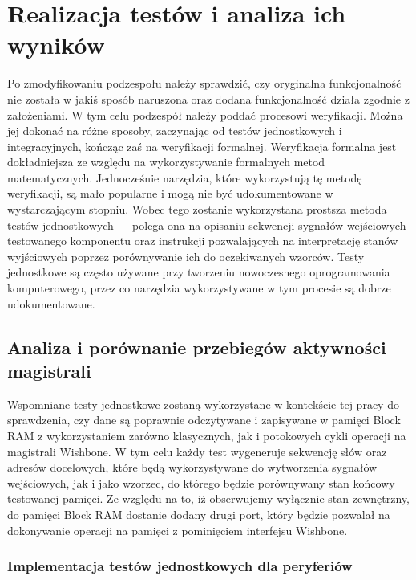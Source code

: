 \section{Realizacja testów i analiza ich wyników}

Po zmodyfikowaniu podzespołu należy sprawdzić, czy oryginalna funkcjonalność nie została w jakiś sposób naruszona oraz dodana funkcjonalność działa zgodnie z założeniami. W tym celu podzespół należy poddać procesowi weryfikacji. Można jej dokonać na różne sposoby, zaczynając od testów jednostkowych i integracyjnych, kończąc zaś na weryfikacji formalnej.
Weryfikacja formalna jest dokładniejsza ze względu na wykorzystywanie formalnych metod matematycznych. Jednocześnie narzędzia, które wykorzystują tę metodę weryfikacji, są mało popularne i mogą nie być udokumentowane w wystarczającym stopniu. Wobec tego zostanie wykorzystana prostsza metoda testów jednostkowych --- polega ona na opisaniu sekwencji sygnałów wejściowych testowanego komponentu oraz instrukcji pozwalających na interpretację stanów wyjściowych poprzez porównywanie ich do oczekiwanych wzorców.
Testy jednostkowe są często używane przy tworzeniu nowoczesnego oprogramowania komputerowego, przez co narzędzia wykorzystywane w tym procesie są dobrze udokumentowane.

\subsection{Analiza i porównanie przebiegów aktywności magistrali}

Wspomniane testy jednostkowe zostaną wykorzystane w kontekście tej pracy do sprawdzenia, czy dane są poprawnie odczytywane i zapisywane w pamięci Block RAM z wykorzystaniem zarówno klasycznych, jak i potokowych cykli operacji na magistrali Wishbone. W tym celu każdy test wygeneruje sekwencję słów oraz adresów docelowych, które będą wykorzystywane do wytworzenia sygnałów wejściowych, jak i jako wzorzec, do którego będzie porównywany stan końcowy testowanej pamięci.
Ze względu na to, iż obserwujemy wyłącznie stan zewnętrzny, do pamięci Block RAM dostanie dodany drugi port, który będzie pozwalał na dokonywanie operacji na pamięci z pominięciem interfejsu Wishbone.

\subsubsection{Implementacja testów jednostkowych dla peryferiów}

